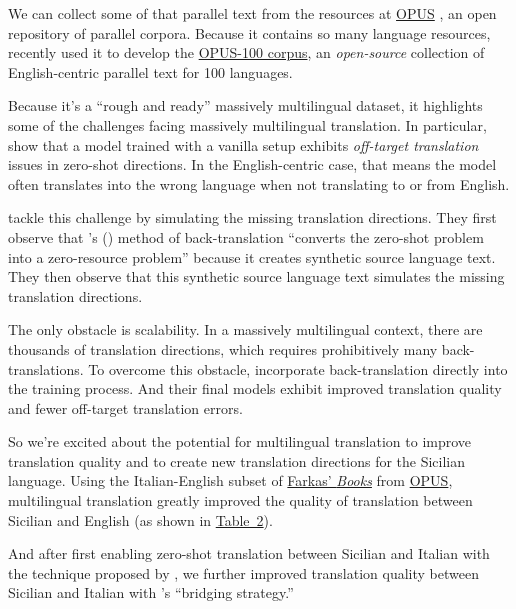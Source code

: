 \documentclass[10pt,letterpaper]{article}
\begin{document}
We can collect some of that parallel text from the resources at 
\href{http://opus.nlpl.eu/}{OPUS} \citep{tiedemann2012}, an open repository of parallel corpora.
Because it contains so many language resources,
\citet{zhang2020improving} recently used it to develop the 
\href{http://opus.nlpl.eu/opus-100.php}{OPUS-100 corpus}, an
\textit{open-source} collection of English-centric parallel text for 100 languages.

Because it's a ``rough and ready'' massively multilingual dataset, it highlights some of the challenges
facing massively multilingual translation.  In particular, \citeauthor{zhang2020improving}
show that a model trained with a vanilla setup exhibits \textit{off-target translation} issues
in zero-shot directions.  In the English-centric case, that means
the model often translates into	the wrong language when not translating to or from English.

\citeauthor{zhang2020improving} tackle this challenge by simulating the missing translation directions.
They first observe that \citeauthor{sennrich2015backtrans}'s (\citeyear{sennrich2015backtrans})
method of back-translation ``converts the zero-shot problem into a zero-resource problem''
because it creates synthetic source language text.  They then observe that this
synthetic source language text simulates the missing translation directions.

The only obstacle is scalability.  In a massively multilingual context, there are thousands of
translation directions, which requires prohibitively many back-translations.  To overcome this obstacle,
\citeauthor{zhang2020improving} incorporate back-translation directly into the training process.
And their final models exhibit improved translation quality and fewer off-target translation errors.

So we're excited about the potential for multilingual translation to improve translation quality and
to create new translation directions for the Sicilian language.
Using the Italian-English subset of
\href{https://farkastranslations.com/bilingual_books.php}{Farkas' \textit{Books}} from \href{https://opus.nlpl.eu/}{OPUS}, 
multilingual translation greatly improved the
quality of translation between Sicilian and English
(as shown in \hyperlink{bleuscores}{Table~2}).



And after first enabling zero-shot translation between Sicilian and Italian with the technique proposed by
\citeauthor{johnson2017zeroshot}, we further improved translation quality between Sicilian and Italian with
\citeauthor{fan2020beyond}'s ``bridging strategy.''
\end{document}
